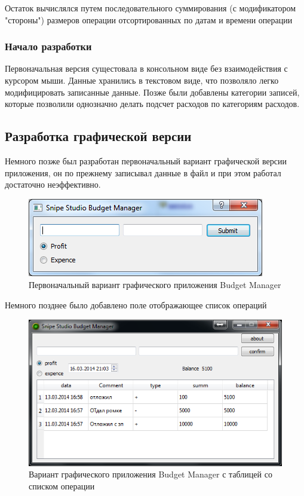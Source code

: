 Остаток вычислялся путем последовательного суммирования (с модификатором "стороны") размеров операции отсортированных по датам и времени
операции

\subsubsection{Начало разработки}
Первоначальная версия сущестовала в консольном виде без взаимодействия с курсором мыши. Данные хранились в текстовом виде, что позволяло
легко модифицировать записанные данные. Позже были добавлены категории записей, которые позволили однозначно делать подсчет расходов по категориям расходов.

\subsection{Разработка графической версии}
Немного позже был разработан первоначальный вариант графической версии приложения, он по прежнему записывал данные в файл и при этом работал достаточно неэффективно.

\begin{figure}[H]
	\centering
	\includegraphics[width=0.7\linewidth]{pics/firstVersion.png}
	\caption{Первоначальный вариант графического приложения Budget Manager}
	\label{fig:firstVersion}
\end{figure}

Немного позднее было добавлено поле отображающее список операций

\begin{figure}[H]
	\centering
	\includegraphics[width=0.7\linewidth]{pics/secondVersion.png}
	\caption{Вариант графического приложения Budget Manager с таблицей со списком
операции}
	\label{fig:secondVersion}
\end{figure}

